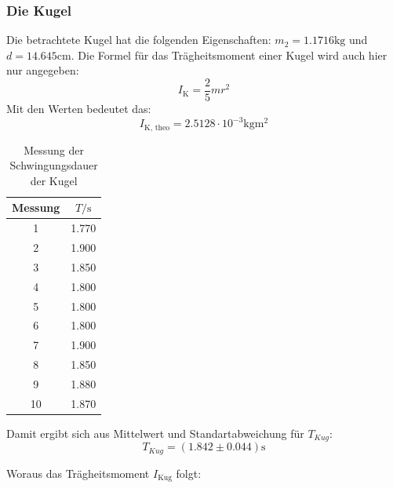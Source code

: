 \subsubsection*{Die Kugel}

Die betrachtete Kugel hat die folgenden Eigenschaften: $m_2 = 1.1716\unit{\kilo\gram}$ und $d = 14.645\unit{\centi\meter}$.
Die Formel für das Trägheitsmoment einer Kugel wird auch hier nur angegeben:
\begin{equation*}
  I_{\text{K}} = \frac{2}{5} m r^2
\end{equation*}
Mit den Werten bedeutet das:
\begin{equation*}
  I_{\text{K, theo}} = 2.5128 \cdot 10^{-3} \unit{\kilo\gram\meter\squared}
\end{equation*}

\begin{table}[H]
  \centering
  \caption{Messung der Schwingungsdauer der Kugel}
  \label{tab:SchwingungsdauerKugel}
  \begin{tabular}{c c}
    \toprule
    Messung &  $T / \unit\second$ \\
    \midrule
              1 &        1.770 \\
              2 &        1.900 \\
              3 &        1.850 \\
              4 &        1.800 \\
              5 &        1.800 \\
              6 &        1.800 \\
              7 &        1.900 \\
              8 &        1.850 \\
              9 &        1.880 \\
             10 &        1.870 \\
    \bottomrule
    \end{tabular}
\end{table}

Damit ergibt sich aus Mittelwert und Standartabweichung für $T_{Kug}$:
\begin{equation*}
  T_{Kug} = (1.842 \pm 0.044) \unit\second
\end{equation*}

Woraus das Trägheitsmoment $I_{\text{Kug}}$ folgt:



